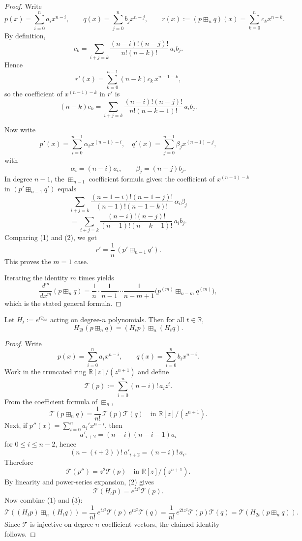 \begin{proof}
Write
\[
p(x)=\sum_{i=0}^n a_i x^{n-i},\qquad
q(x)=\sum_{j=0}^n b_j x^{n-j},\qquad
r(x):=(p\boxplus_n q)(x)=\sum_{k=0}^n c_k x^{n-k}.
\]
By definition,
\[
c_k=\sum_{i+j=k}\frac{(n-i)!(n-j)!}{n!(n-k)!}\,a_i b_j.
\]
Hence
\[
r'(x)=\sum_{k=0}^{n-1}(n-k)c_k\,x^{n-1-k},
\]
so the coefficient of $x^{(n-1)-k}$ in $r'$ is
\[
(n-k)c_k
=
\sum_{i+j=k}\frac{(n-i)!(n-j)!}{n!(n-k-1)!}\,a_i b_j.
\tag{1}
\]

Now write
\[
p'(x)=\sum_{i=0}^{n-1}\alpha_i x^{(n-1)-i},
\quad
q'(x)=\sum_{j=0}^{n-1}\beta_j x^{(n-1)-j},
\]
with
\[
\alpha_i=(n-i)a_i,\qquad \beta_j=(n-j)b_j.
\]
In degree $n-1$, the $\boxplus_{n-1}$ coefficient formula gives:
the coefficient of $x^{(n-1)-k}$ in $(p'\boxplus_{n-1}q')$ equals
\[
\sum_{i+j=k}
\frac{(n-1-i)!(n-1-j)!}{(n-1)!(n-1-k)!}\,\alpha_i\beta_j
\]
\[
=
\sum_{i+j=k}
\frac{(n-i)!(n-j)!}{(n-1)!(n-k-1)!}\,a_i b_j.
\tag{2}
\]
Comparing (1) and (2), we get
\[
r'=\frac1n\,(p'\boxplus_{n-1}q').
\]
This proves the $m=1$ case.

Iterating the identity $m$ times yields
\[
\frac{d^m}{dx^m}(p\boxplus_n q)
=
\frac1n\cdot\frac1{n-1}\cdots\frac1{n-m+1}
\bigl(p^{(m)}\boxplus_{n-m} q^{(m)}\bigr),
\]
which is the stated general formula.
\end{proof}

\begin{lemma}\label{lem:q4-heat-intertwine}
Let $H_t:=e^{t\partial_{xx}}$ acting on degree-$n$ polynomials.
Then for all $t\in\mathbb R$,
\[
H_{2t}(p\boxplus_n q)=(H_t p)\boxplus_n(H_t q).
\]
\end{lemma}

\begin{proof}
Write
\[
p(x)=\sum_{i=0}^n a_i x^{n-i},\qquad
q(x)=\sum_{i=0}^n b_i x^{n-i}.
\]
Work in the truncated ring $\mathbb R[z]/(z^{n+1})$ and define
\[
\mathcal T(p):=\sum_{i=0}^n (n-i)!\,a_i z^i.
\]
From the coefficient formula of $\boxplus_n$,
\[
\mathcal T(p\boxplus_n q)=\frac1{n!}\,\mathcal T(p)\mathcal T(q)
\quad\text{in }\mathbb R[z]/(z^{n+1}).
\tag{1}
\]
Next, if $p''(x)=\sum_{i=0}^n a_i' x^{n-i}$, then
\[
a'_{i+2}=(n-i)(n-i-1)a_i
\]
for $0\le i\le n-2$, hence
\[
(n-(i+2))!\,a'_{i+2}=(n-i)!\,a_i.
\]
Therefore
\[
\mathcal T(p'')=z^2\mathcal T(p)
\quad\text{in }\mathbb R[z]/(z^{n+1}).
\tag{2}
\]
By linearity and power-series expansion, (2) gives
\[
\mathcal T(H_t p)=e^{t z^2}\mathcal T(p).
\tag{3}
\]
Now combine (1) and (3):
\[
\mathcal T\!\left((H_t p)\boxplus_n(H_t q)\right)
=\frac1{n!}\,e^{t z^2}\mathcal T(p)\,e^{t z^2}\mathcal T(q)
=\frac1{n!}\,e^{2t z^2}\mathcal T(p)\mathcal T(q)
=\mathcal T\!\left(H_{2t}(p\boxplus_n q)\right).
\]
Since $\mathcal T$ is injective on degree-$n$ coefficient vectors, the claimed identity follows.
\end{proof}


